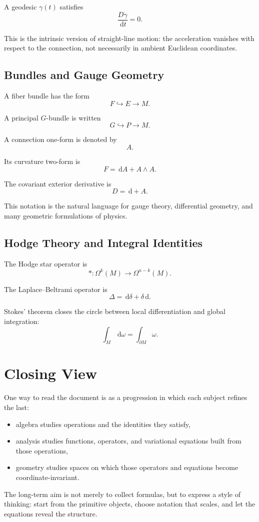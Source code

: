 \documentclass[11pt]{article}
\newcommand{\dd}{\,\mathrm{d}}
\begin{document}
A geodesic \(\gamma(t)\) satisfies
\[
  \frac{D \dot{\gamma}}{\dd t} = 0.
\]

This is the intrinsic version of straight-line motion: the acceleration
vanishes with respect to the connection, not necessarily in ambient Euclidean
coordinates.

\subsection{Bundles and Gauge Geometry}

A fiber bundle has the form
\[
  F \hookrightarrow E \to M.
\]

A principal \(G\)-bundle is written
\[
  G \hookrightarrow P \to M.
\]

A connection one-form is denoted by
\[
  A.
\]

Its curvature two-form is
\[
  F = \dd A + A \wedge A.
\]

The covariant exterior derivative is
\[
  D = \dd + A.
\]

This notation is the natural language for gauge theory, differential geometry,
and many geometric formulations of physics.

\subsection{Hodge Theory and Integral Identities}

The Hodge star operator is
\[
  * : \Omega^k(M) \to \Omega^{n-k}(M).
\]

The Laplace--Beltrami operator is
\[
  \Delta = \dd \delta + \delta \dd.
\]

Stokes' theorem closes the circle between local differentiation and global
integration:
\[
  \int_M \dd \omega = \int_{\partial M} \omega.
\]

\section{Closing View}

One way to read the document is as a progression in which each subject refines
the last:
\begin{itemize}
  \item algebra studies operations and the identities they satisfy,
  \item analysis studies functions, operators, and variational equations built
  from those operations,
  \item geometry studies spaces on which those operators and equations become
  coordinate-invariant.
\end{itemize}

The long-term aim is not merely to collect formulas, but to express a style of
thinking: start from the primitive objects, choose notation that scales, and let
the equations reveal the structure.
\end{document}
